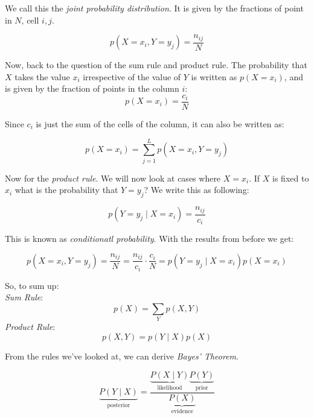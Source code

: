 We call this the \textit{joint probability distribution}. It is given by the fractions of point in $N$, cell $i,j$.

\begin{equation*}
	p(X =  x_{i}, Y = y_{j}) = \frac{n_{ij}}{N}
\end{equation*}

Now, back to the question of the sum rule and product rule. The probability that $X$  takes the value $x_{i}$ irrespective of the value of $Y$ is written as $p(X = x_{i})$, and is given by the fraction of points in the column $i$:
\begin{equation*}
	p(X = x_{i}) = \frac{c_{i}}{N}
\end{equation*}

Since $c_{i}$ is just the  sum of the cells of the column, it can also be written as:

\begin{equation*}
	p(X = x_{i}) = \sum_{j=1}^L p(X=x_{i}, Y=y_{j})
\end{equation*}

Now for the \textit{product rule}. We will now look at cases where $X = x_{i}$. If $X$ is fixed to $x_{i}$ what is the probability that $Y = y_{j}$? We write this as following:

\begin{equation*}
	p \left( Y=y_{j} \mid X = x_{i} \right) = \frac{n_{ij}}{c_{i}}
\end{equation*}

This is known as \textit{conditionatl probability}. With the results from before we get:

\begin{equation*}
	p \left( X = x_{i}, Y = y_{j} \right) = \frac{n_{ij}}{N} = \frac{n_{ij}}{c_{i}} \cdot \frac{c_{i}}{N} = p \left( Y = y_{j} \mid X = x_{i} \right) p \left( X = x_{i} \right)
\end{equation*}

So, to sum up:\\
\noindent
\textit{Sum Rule}:
\begin{equation}
	p(X) = \sum_Y p(X,Y)
\end{equation}
\noindent
\textit{Product Rule}:
\begin{equation}
	p(X,Y) = p(Y \mid X)	p(X)
\end{equation}

From the rules we've looked at, we can derive \textit{Bayes' Theorem}.

\begin{equation}
	\underbrace{P(Y \mid X)}_{\text{posterior}} = \frac{\underbrace{P(X \mid Y)}_{\text{likelihood}} \underbrace{P(Y)}_{\text{prior}}}{\underbrace{P(X)}_{\text{evidence}}}
\end{equation}

